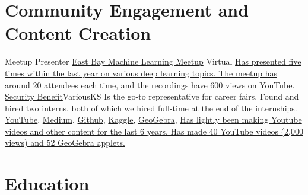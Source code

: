 \documentclass[11pt,a4paper,sans]{moderncv}
\begin{document}
\section{Community Engagement and Content Creation}
    {Meetup Presenter}
    {\href{https://www.meetup.com/east-bay-tri-valley-machine-learning-meetup/}{East Bay Machine Learning Meetup}}
    {Virtual}{}
    {\href{https://www.youtube.com/playlist?list=PLytZkHFJwKUf-P1Q_AD-hvYKyH0VREKWw}
        {Has presented five times within the last year
        on various deep learning topics.
        The meetup has around 20 attendees each time, and
        the recordings have 600 views on YouTube.}}
    {\href{https://www.securitybenefit.com/splash-page}{Security Benefit}}{Various}{KS}
    {Is the go-to representative for career fairs.
    Found and hired two interns, both of which we hired full-time
    at the end of the internships.}
    {\href{https://www.youtube.com/@grantsmith3653/featured}{YouTube},
    \href{https://medium.com/@14.gsmith.14}{Medium},
    \href{https://github.com/GSmithApps}{Github},
    \href{https://www.kaggle.com/grannysmithapples}{Kaggle},
    \href{https://www.geogebra.org/u/gsmithapples}{GeoGebra},
    }
    {}{}{\href{https://www.youtube.com/@grantsmith3653/featured}{
        Has lightly been making Youtube videos and
        other content for the last 6 years.
        Has made 40 YouTube videos (2,000 views) and 52 GeoGebra applets.}}
            
            
            
\section{Education}
\end{document}
